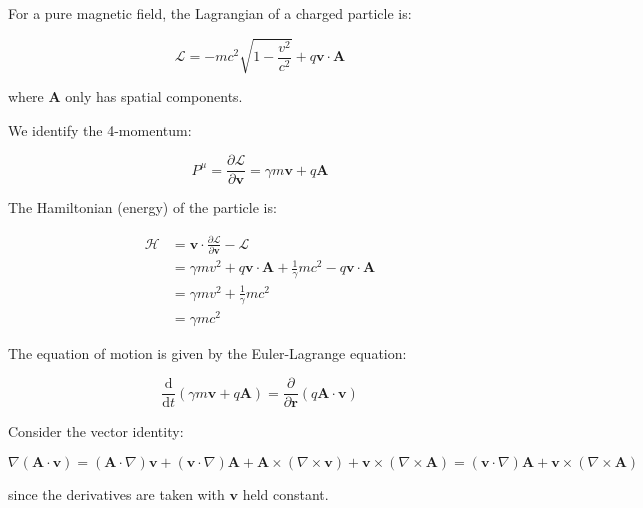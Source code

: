 \documentclass[12pt]{article}
\begin{document}
For a pure magnetic field, the Lagrangian of a charged particle is:

\begin{equation}
    \mathcal{L} = -mc^{2} \sqrt{1 - \frac{v^{2}}{c^{2}}} + q \mathbf{v} \cdot \mathbf{A}
\end{equation}

where $\mathbf{A}$ only has spatial components.

We identify the 4-momentum:

\begin{equation}
    P^{\mu} = \frac{\partial \mathcal{L}}{\partial \mathbf{v}} = \gamma m \mathbf{v} + q \mathbf{A}
\end{equation}

The Hamiltonian (energy) of the particle is:

\begin{equation}
    \begin{split}
        \mathcal{H} &= \mathbf{v} \cdot \frac{\partial \mathcal{L}}{\partial \mathbf{v}} - \mathcal{L} \\
        &= \gamma m v^{2} + q \mathbf{v} \cdot \mathbf{A} + \frac{1}{\gamma} mc^{2} - q \mathbf{v} \cdot \mathbf{A} \\
        &= \gamma m v^{2} + \frac{1}{\gamma} mc^{2} \\
        &= \gamma m c^{2}
    \end{split}
\end{equation}

The equation of motion is given by the Euler-Lagrange equation:

\begin{equation}
    \frac{\mathrm{d}}{\mathrm{d}t} \left( \gamma m \mathbf{v} + q \mathbf{A} \right) = \frac{\partial }{\partial \mathbf{r}} \left( q \mathbf{A} \cdot \mathbf{v} \right)
\end{equation}

Consider the vector identity:

\begin{equation}
    \nabla \left( \mathbf{A} \cdot \mathbf{v} \right) = (\mathbf{A} \cdot \nabla) \mathbf{v} + (\mathbf{v} \cdot \nabla) \mathbf{A} + \mathbf{A} \times (\nabla \times \mathbf{v}) + \mathbf{v} \times (\nabla \times \mathbf{A}) = (\mathbf{v} \cdot \nabla) \mathbf{A} + \mathbf{v} \times (\nabla \times \mathbf{A})
\end{equation}

since the derivatives are taken with $\mathbf{v}$ held constant.
\end{document}

